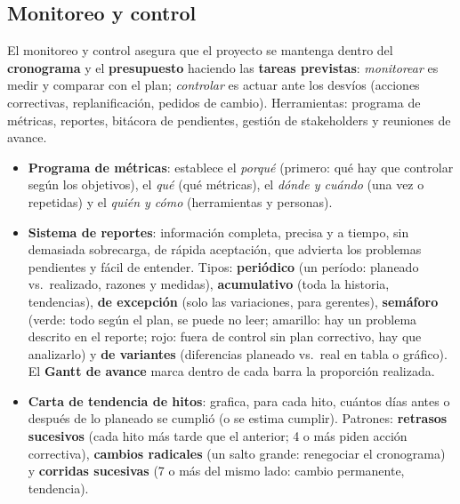 \documentclass[11pt,a4paper]{article}
\begin{document}
\subsection{Monitoreo y control}
El monitoreo y control asegura que el proyecto se mantenga dentro del \textbf{cronograma} y el
\textbf{presupuesto} haciendo las \textbf{tareas previstas}: \emph{monitorear} es medir y comparar con el plan;
\emph{controlar} es actuar ante los desvíos (acciones correctivas, replanificación, pedidos de cambio).
Herramientas: programa de métricas, reportes, bitácora de pendientes, gestión de stakeholders y reuniones de
avance.
\begin{itemize}
  \item \textbf{Programa de métricas}: establece el \emph{porqué} (primero: qué hay que controlar según los
  objetivos), el \emph{qué} (qué métricas), el \emph{dónde y cuándo} (una vez o repetidas) y el \emph{quién y
  cómo} (herramientas y personas).
  \item \textbf{Sistema de reportes}: información completa, precisa y a tiempo, sin demasiada sobrecarga, de
  rápida aceptación, que advierta los problemas pendientes y fácil de entender. Tipos: \textbf{periódico} (un
  período: planeado vs.\ realizado, razones y medidas), \textbf{acumulativo} (toda la historia, tendencias),
  \textbf{de excepción} (solo las variaciones, para gerentes), \textbf{semáforo} (\textcolor{verde}{verde}: todo
  según el plan, se puede no leer; \textcolor{ambar}{amarillo}: hay un problema descrito en el reporte;
  \textcolor{critrojo}{rojo}: fuera de control sin plan correctivo, hay que analizarlo) y \textbf{de variantes}
  (diferencias planeado vs.\ real en tabla o gráfico). El \textbf{Gantt de avance} marca dentro de cada barra la
  proporción realizada.
  \item \textbf{Carta de tendencia de hitos}: grafica, para cada hito, cuántos días antes o después de lo
  planeado se cumplió (o se estima cumplir). Patrones: \textbf{retrasos sucesivos} (cada hito más tarde que el
  anterior; 4 o más piden acción correctiva), \textbf{cambios radicales} (un salto grande: renegociar el
  cronograma) y \textbf{corridas sucesivas} (7 o más del mismo lado: cambio permanente, tendencia).
\end{itemize}
\end{document}
